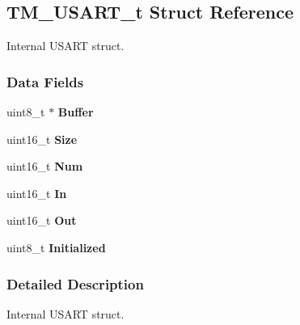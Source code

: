 \hypertarget{struct_t_m___u_s_a_r_t__t}{}\subsection{T\+M\+\_\+\+U\+S\+A\+R\+T\+\_\+t Struct Reference}
\label{struct_t_m___u_s_a_r_t__t}


Internal U\+S\+A\+R\+T struct.  


\subsubsection*{Data Fields}
\begin{DoxyCompactItemize}
\item 
\hypertarget{struct_t_m___u_s_a_r_t__t_a095175dabcb7cd83bddf2bea50371121}{}uint8\+\_\+t $\ast$ {\bfseries Buffer}\label{struct_t_m___u_s_a_r_t__t_a095175dabcb7cd83bddf2bea50371121}

\item 
\hypertarget{struct_t_m___u_s_a_r_t__t_a7da24467a0654ce2d1b0d8d0a09eee4b}{}uint16\+\_\+t {\bfseries Size}\label{struct_t_m___u_s_a_r_t__t_a7da24467a0654ce2d1b0d8d0a09eee4b}

\item 
\hypertarget{struct_t_m___u_s_a_r_t__t_aa8ad70c8644f7369fd0182770dbc5eac}{}uint16\+\_\+t {\bfseries Num}\label{struct_t_m___u_s_a_r_t__t_aa8ad70c8644f7369fd0182770dbc5eac}

\item 
\hypertarget{struct_t_m___u_s_a_r_t__t_ae89ed8ee3aa3edff77e794ebf35c4119}{}uint16\+\_\+t {\bfseries In}\label{struct_t_m___u_s_a_r_t__t_ae89ed8ee3aa3edff77e794ebf35c4119}

\item 
\hypertarget{struct_t_m___u_s_a_r_t__t_a9c564f31214fd1098e911b1a91c735b5}{}uint16\+\_\+t {\bfseries Out}\label{struct_t_m___u_s_a_r_t__t_a9c564f31214fd1098e911b1a91c735b5}

\item 
\hypertarget{struct_t_m___u_s_a_r_t__t_a885a68e632ab9a6189c31f5f8a648f35}{}uint8\+\_\+t {\bfseries Initialized}\label{struct_t_m___u_s_a_r_t__t_a885a68e632ab9a6189c31f5f8a648f35}

\end{DoxyCompactItemize}


\subsubsection{Detailed Description}
Internal U\+S\+A\+R\+T struct. 

